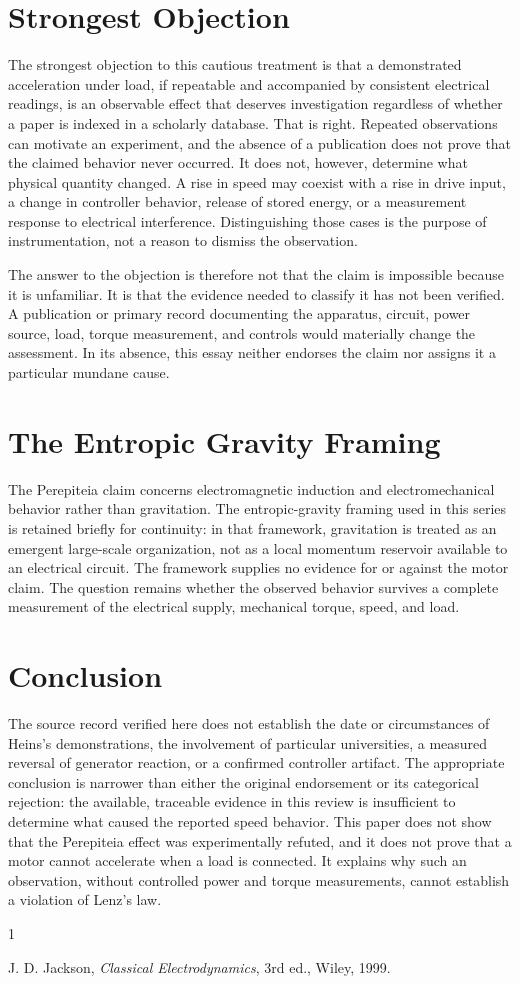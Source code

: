 \documentclass[11pt]{article}
\begin{document}
\section{Strongest Objection}

The strongest objection to this cautious treatment is that a demonstrated acceleration under load, if repeatable and accompanied by consistent electrical readings, is an observable effect that deserves investigation regardless of whether a paper is indexed in a scholarly database. That is right. Repeated observations can motivate an experiment, and the absence of a publication does not prove that the claimed behavior never occurred. It does not, however, determine what physical quantity changed. A rise in speed may coexist with a rise in drive input, a change in controller behavior, release of stored energy, or a measurement response to electrical interference. Distinguishing those cases is the purpose of instrumentation, not a reason to dismiss the observation.

The answer to the objection is therefore not that the claim is impossible because it is unfamiliar. It is that the evidence needed to classify it has not been verified. A publication or primary record documenting the apparatus, circuit, power source, load, torque measurement, and controls would materially change the assessment. In its absence, this essay neither endorses the claim nor assigns it a particular mundane cause.

\section{The Entropic Gravity Framing}

The Perepiteia claim concerns electromagnetic induction and electromechanical behavior rather than gravitation. The entropic-gravity framing used in this series is retained briefly for continuity: in that framework, gravitation is treated as an emergent large-scale organization, not as a local momentum reservoir available to an electrical circuit. The framework supplies no evidence for or against the motor claim. The question remains whether the observed behavior survives a complete measurement of the electrical supply, mechanical torque, speed, and load.

\section{Conclusion}

The source record verified here does not establish the date or circumstances of Heins's demonstrations, the involvement of particular universities, a measured reversal of generator reaction, or a confirmed controller artifact. The appropriate conclusion is narrower than either the original endorsement or its categorical rejection: the available, traceable evidence in this review is insufficient to determine what caused the reported speed behavior. This paper does not show that the Perepiteia effect was experimentally refuted, and it does not prove that a motor cannot accelerate when a load is connected. It explains why such an observation, without controlled power and torque measurements, cannot establish a violation of Lenz's law.

\begin{thebibliography}{1}

 J. D. Jackson, \emph{Classical Electrodynamics}, 3rd ed., Wiley, 1999.

\end{thebibliography}
\end{document}
